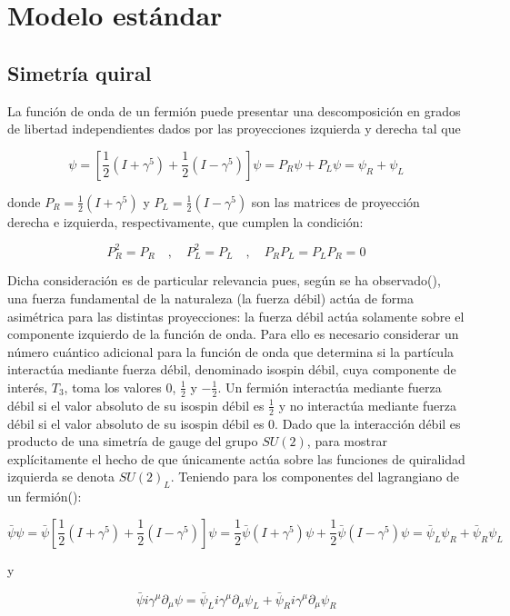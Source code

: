 \chapter{Modelo estándar}

\section{Simetría quiral}

La función de onda de un fermión puede presentar una descomposición en grados de libertad independientes dados por las proyecciones izquierda y derecha tal que

$$ \psi = \left[\frac{1}{2}(I+\gamma^5) + \frac{1}{2}(I-\gamma^5) \right]\psi = P_R\psi + P_L\psi = \psi_R + \psi_L $$

donde $P_R=\frac{1}{2}(I+\gamma^5)$ y $P_L=\frac{1}{2}(I-\gamma^5)$ son las matrices de proyección derecha e izquierda, respectivamente, que cumplen la condición:

$$ P_R^2=P_R \quad , \quad P_L^2=P_L \quad , \quad P_RP_L=P_LP_R = 0 $$

Dicha consideración es de particular relevancia pues, según se ha observado(\cite{wu1957experimental}), una fuerza fundamental de la naturaleza (la fuerza débil) actúa de forma asimétrica para las distintas proyecciones: la fuerza débil actúa solamente sobre el componente izquierdo de la función de onda. Para ello es necesario considerar un número cuántico adicional para la función de onda que determina si la partícula interactúa mediante fuerza débil, denominado isospin débil, cuya componente de interés, $T_3$, toma los valores 0, $\frac{1}{2}$ y $-\frac{1}{2}$. Un fermión interactúa mediante fuerza débil si el valor absoluto de su isospin débil es $\frac{1}{2}$ y no interactúa mediante fuerza débil si el valor absoluto de su isospin débil es 0. Dado que la interacción débil es producto de una simetría de gauge del grupo $SU(2)$, para mostrar explícitamente el hecho de que únicamente actúa sobre las funciones de quiralidad izquierda se denota $SU(2)_L$. Teniendo para los componentes del lagrangiano de un fermión(\cite{cheng2000gauge}):

$$ \bar{\psi}\psi = \bar{\psi} \left[\frac{1}{2}(I+\gamma^5) + \frac{1}{2}(I-\gamma^5) \right] \psi = \frac{1}{2}\bar{\psi}(I+\gamma^5)\psi + \frac{1}{2}\bar{\psi}(I-\gamma^5)\psi = \bar{\psi}_L\psi_R + \bar{\psi}_R\psi_L $$

y 

$$ \bar{\psi}i\gamma^{\mu}\partial_{\mu}\psi = \bar{\psi}_Li\gamma^{\mu}\partial_{\mu}\psi_L + \bar{\psi}_Ri\gamma^{\mu}\partial_{\mu}\psi_R $$

